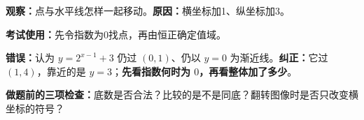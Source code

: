 \clearpage
\begin{trapbox}
\begin{description}[style=nextline,leftmargin=2.8em,labelsep=0.5em,itemsep=0.45em]
  \item[\textbf{\textcolor{CTrap}{易错点七（把平移后的定点、水平线照搬）}}]


\textbf{观察：}点与水平线怎样一起移动。\quad\textbf{原因：}横坐标加1、纵坐标加3。

\textbf{考试使用：}先令指数为0找点，再由恒正确定值域。


  \textbf{错误：}认为 $y=2^{x-1}+3$ 仍过 $(0,1)$、仍以 $y=0$ 为渐近线。\textbf{纠正：}它过 $(1,4)$，靠近的是 $y=3$；\textbf{先看指数何时为 $0$，再看整体加了多少}。
\end{description}

\textbf{\textcolor{CTrap}{做题前的三项检查：}}底数是否合法？比较的是不是同底？翻转图像时是否只改变横坐标的符号？

\end{trapbox}
